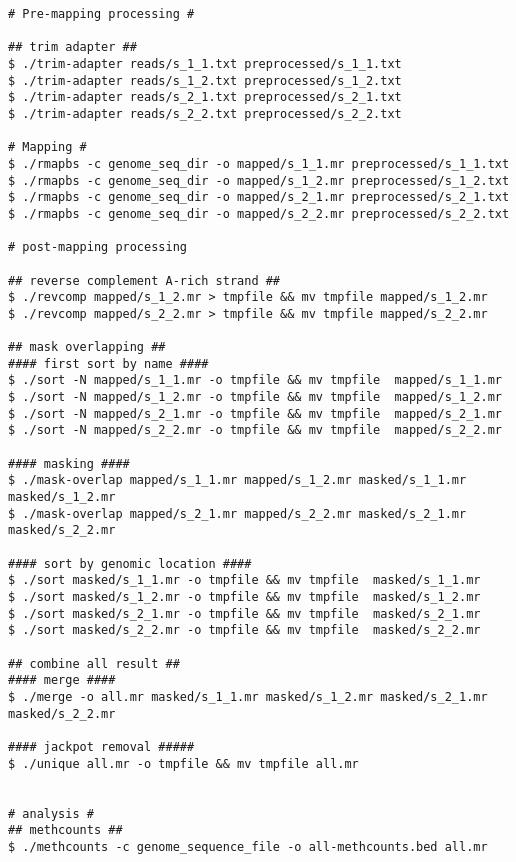 \documentclass{article}
\begin{document}
\begin{verbatim}
# Pre-mapping processing #

## trim adapter ##
$ ./trim-adapter reads/s_1_1.txt preprocessed/s_1_1.txt
$ ./trim-adapter reads/s_1_2.txt preprocessed/s_1_2.txt
$ ./trim-adapter reads/s_2_1.txt preprocessed/s_2_1.txt
$ ./trim-adapter reads/s_2_2.txt preprocessed/s_2_2.txt

# Mapping #
$ ./rmapbs -c genome_seq_dir -o mapped/s_1_1.mr preprocessed/s_1_1.txt
$ ./rmapbs -c genome_seq_dir -o mapped/s_1_2.mr preprocessed/s_1_2.txt
$ ./rmapbs -c genome_seq_dir -o mapped/s_2_1.mr preprocessed/s_2_1.txt
$ ./rmapbs -c genome_seq_dir -o mapped/s_2_2.mr preprocessed/s_2_2.txt

# post-mapping processing

## reverse complement A-rich strand ##
$ ./revcomp mapped/s_1_2.mr > tmpfile && mv tmpfile mapped/s_1_2.mr
$ ./revcomp mapped/s_2_2.mr > tmpfile && mv tmpfile mapped/s_2_2.mr

## mask overlapping ##
#### first sort by name ####
$ ./sort -N mapped/s_1_1.mr -o tmpfile && mv tmpfile  mapped/s_1_1.mr 
$ ./sort -N mapped/s_1_2.mr -o tmpfile && mv tmpfile  mapped/s_1_2.mr 
$ ./sort -N mapped/s_2_1.mr -o tmpfile && mv tmpfile  mapped/s_2_1.mr 
$ ./sort -N mapped/s_2_2.mr -o tmpfile && mv tmpfile  mapped/s_2_2.mr 

#### masking ####
$ ./mask-overlap mapped/s_1_1.mr mapped/s_1_2.mr masked/s_1_1.mr masked/s_1_2.mr
$ ./mask-overlap mapped/s_2_1.mr mapped/s_2_2.mr masked/s_2_1.mr masked/s_2_2.mr

#### sort by genomic location ####
$ ./sort masked/s_1_1.mr -o tmpfile && mv tmpfile  masked/s_1_1.mr 
$ ./sort masked/s_1_2.mr -o tmpfile && mv tmpfile  masked/s_1_2.mr 
$ ./sort masked/s_2_1.mr -o tmpfile && mv tmpfile  masked/s_2_1.mr 
$ ./sort masked/s_2_2.mr -o tmpfile && mv tmpfile  masked/s_2_2.mr 

## combine all result ##
#### merge ####
$ ./merge -o all.mr masked/s_1_1.mr masked/s_1_2.mr masked/s_2_1.mr masked/s_2_2.mr 

#### jackpot removal #####
$ ./unique all.mr -o tmpfile && mv tmpfile all.mr


# analysis #
## methcounts ##
$ ./methcounts -c genome_sequence_file -o all-methcounts.bed all.mr 
\end{verbatim}
\end{document}
